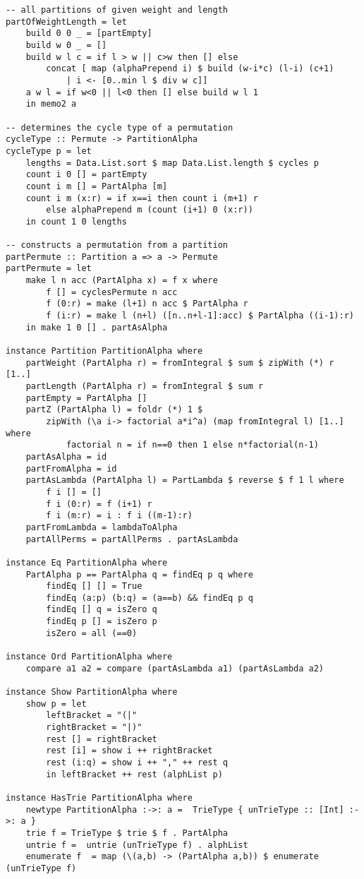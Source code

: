 \begin{lstlisting}
-- all partitions of given weight and length
partOfWeightLength = let
	build 0 0 _ = [partEmpty]
	build w 0 _ = []
	build w l c = if l > w || c>w then [] else
		concat [ map (alphaPrepend i) $ build (w-i*c) (l-i) (c+1) 
			| i <- [0..min l $ div w c]]
	a w l = if w<0 || l<0 then [] else build w l 1
	in memo2 a

-- determines the cycle type of a permutation
cycleType :: Permute -> PartitionAlpha
cycleType p = let 
	lengths = Data.List.sort $ map Data.List.length $ cycles p
	count i 0 [] = partEmpty
	count i m [] = PartAlpha [m]
	count i m (x:r) = if x==i then count i (m+1) r 
		else alphaPrepend m (count (i+1) 0 (x:r)) 
	in count 1 0 lengths

-- constructs a permutation from a partition
partPermute :: Partition a => a -> Permute
partPermute = let
	make l n acc (PartAlpha x) = f x where
		f [] = cyclesPermute n acc 
		f (0:r) = make (l+1) n acc $ PartAlpha r
		f (i:r) = make l (n+l) ([n..n+l-1]:acc) $ PartAlpha ((i-1):r)
	in make 1 0 [] . partAsAlpha

instance Partition PartitionAlpha where
	partWeight (PartAlpha r) = fromIntegral $ sum $ zipWith (*) r [1..]
	partLength (PartAlpha r) = fromIntegral $ sum r
	partEmpty = PartAlpha []
	partZ (PartAlpha l) = foldr (*) 1 $ 
		zipWith (\a i-> factorial a*i^a) (map fromIntegral l) [1..] where
			factorial n = if n==0 then 1 else n*factorial(n-1)
	partAsAlpha = id
	partFromAlpha = id
	partAsLambda (PartAlpha l) = PartLambda $ reverse $ f 1 l where
		f i [] = []
		f i (0:r) = f (i+1) r
		f i (m:r) = i : f i ((m-1):r)
	partFromLambda = lambdaToAlpha
	partAllPerms = partAllPerms . partAsLambda

instance Eq PartitionAlpha where
	PartAlpha p == PartAlpha q = findEq p q where
		findEq [] [] = True
		findEq (a:p) (b:q) = (a==b) && findEq p q
		findEq [] q = isZero q
		findEq p [] = isZero p 
		isZero = all (==0) 

instance Ord PartitionAlpha where
	compare a1 a2 = compare (partAsLambda a1) (partAsLambda a2)

instance Show PartitionAlpha where 
	show p = let
		leftBracket = "(|"  
		rightBracket = "|)" 
		rest [] = rightBracket
		rest [i] = show i ++ rightBracket
		rest (i:q) = show i ++ "," ++ rest q
		in leftBracket ++ rest (alphList p) 

instance HasTrie PartitionAlpha where
	newtype PartitionAlpha :->: a =  TrieType { unTrieType :: [Int] :->: a }
	trie f = TrieType $ trie $ f . PartAlpha
	untrie f =  untrie (unTrieType f) . alphList
	enumerate f  = map (\(a,b) -> (PartAlpha a,b)) $ enumerate (unTrieType f)


\end{lstlisting}

